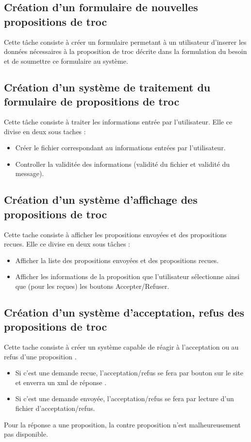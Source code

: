 \documentclass{article}
\begin{document}
\subsection{Création d'un formulaire de nouvelles propositions de troc}
Cette tâche consiste à créer un formulaire permetant à un utilisateur d'inserer les données nécessaires à la proposition de troc décrite dans la formulation du besoin et de soumettre ce formulaire au système.
\subsection{Création d'un système de traitement du formulaire de propositions de troc}
Cette tâche consiste à traiter les informations entrée par l'utilisateur. Elle ce divise en deux sous taches :
\begin{itemize}
  \item Créer le fichier correspondant au informations entrées par l'utilisateur.
  \item Controller la validitée des informations (validité du fichier et validité du message).
\end{itemize}
\subsection{Création d'un système d'affichage des propositions de troc}
Cette tache consiste à afficher les propositions envoyées et des propositions recues. Elle ce divise en deux sous tâches :
\begin{itemize}
  \item Afficher la liste des propositions envoyées et des propositions recues.
  \item Afficher les informations de la proposition que l'utilisateur sélectionne ainsi que (pour les reçues) les boutons Accepter/Refuser.
\end{itemize}
\subsection{Création d'un système d'acceptation, refus des propositions de troc}
Cette tache consiste à créer un système capable de réagir à l'acceptation ou au refus d'une proposition . 
\begin{itemize}
  \item Si c'est une demande recue, l'acceptation/refus se fera par bouton sur le site et enverra un xml de réponse .
  \item Si c'est une demande envoyée, l'acceptation/refus se fera par lecture d'un fichier d'acceptation/refus.
\end{itemize}
Pour la réponse a une proposition, la contre proposition n'est malheureusement pas disponible.
\end{document}

